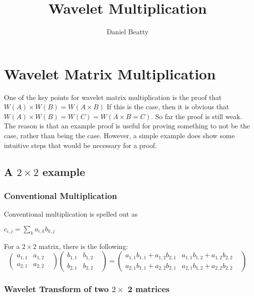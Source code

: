 \documentclass[11pt]{article}
\title{Wavelet Multiplication}
\author{Daniel Beatty}
\begin{document}
\maketitle

\section {Wavelet Matrix Multiplication}

One of the key points for wavelet matrix multiplication is the proof that $W(A) \times W(B) = W(A\times B)$  If this is the case, then it is obvious that $W(A) \times W(B) = W(C) = W(A\times B = C)$.  So far the proof is still weak.  The reason is that an example proof is useful for proving something to not be the case, rather than being the case.   However, a simple example does show some intuitive steps that would be necessary for a proof.  

\subsection{A $2\times 2$ example}
\subsubsection{Conventional Multiplication}

Conventional multiplication is spelled out as

$c_{i,j} = \sum\limits_k a_{i,k} b_{k,j}$

For a $2 \times 2$ matrix, there is the following:
\[
\left(
\begin{array}{ccc}
  a_{1,1}&  a_{1,2} &   \\
 a_{2,1} &  a_{2,2} &   
\end{array}
\right)
\left(
\begin{array}{ccc}
  b_{1,1}&  b_{1,2} &   \\
 b_{2,1} &  b_{2,2} &   
\end{array}
\right) =
\left(
\begin{array}{ccc}
  a_{1,1} b_{1,1} + a_{1,2} b_{2,1}&  a_{1,1}b_{1,2} + a_{1,2}  b_{2,2} &   \\
 a_{2,1} b_{1,1} + a_{2,2} b_{2,1} &  a_{2,1} b_{1,2} + a_{2,2} b_{2,2} &   
\end{array}
\right)
\]

\subsubsection{Wavelet Transform of two $2\times$ 2 matrices}
\end{document}
